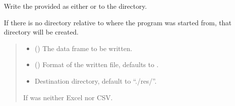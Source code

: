 \documentclass[letterpaper,10pt,english]{sphinxmanual}
\begin{document}

\begin{fulllineitems}
\label{\detokenize{FileHandler:src.FileHandler.write_file}}
\pysigstartsignatures
{}
\pysigstopsignatures
\sphinxAtStartPar
Write the provided  as either  or  to the  directory.

\sphinxAtStartPar
If there is no  directory relative to where the program was started from,
that directory will be created.
\begin{quote}\begin{description}
\begin{itemize}
\item {} 
\sphinxAtStartPar
{} () \textendash{} The data frame to be written.

\item {} 
\sphinxAtStartPar
{} ({\hyperref[\detokenize{FileHandler:src.FileHandler.FileExtensions}]{}}\sphinxstyleliteralemphasis{\sphinxupquote{, }}) \textendash{} Format of the written file, defaults to .

\item {} 
\sphinxAtStartPar
{} \textendash{} Destination directory, default to “./res/”.

\end{itemize}

\sphinxAtStartPar
{} \textendash{} If  was neither Excel nor CSV.

\end{description}\end{quote}

\end{fulllineitems}
\end{document}
